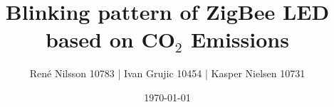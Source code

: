 \documentclass[10pt]{article}
\title{Blinking pattern of ZigBee LED based on CO$_2$ Emissions}
\author{René Nilsson 10783 | Ivan Grujic 10454 | Kasper Nielsen 10731}
\date{\today}
\begin{document}
\maketitle



\listoffixmes
\newpage

\tableofcontents

\newpage


\newpage


\newpage






\newpage


\newpage






\newpage


\newpage
\appendix

\end{document}
